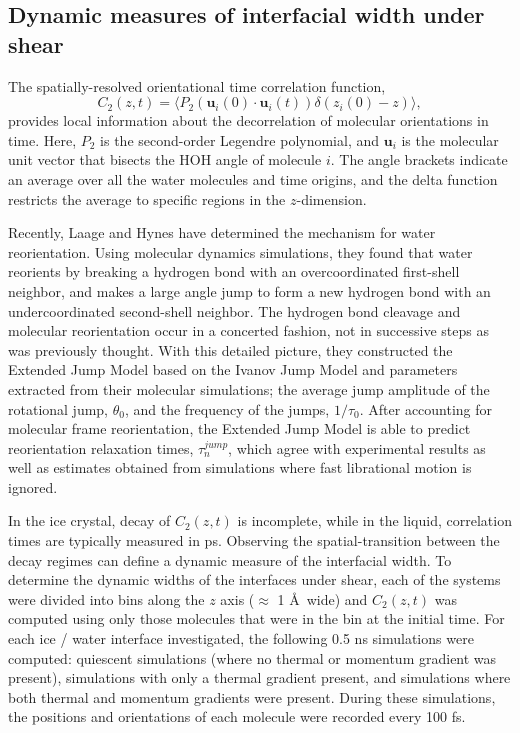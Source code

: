 \subsection{Dynamic measures of interfacial width under shear}
The spatially-resolved orientational time correlation function,
\begin{equation}\label{C(t)1}
  C_{2}(z,t)=\langle P_{2}(\mathbf{u}_i(0)\cdot \mathbf{u}_i(t))
  \delta(z_i(0) - z) \rangle,
\end{equation}
provides local information about the decorrelation of molecular
orientations in time. Here, $P_{2}$ is the second-order Legendre
polynomial, and $\mathbf{u}_i$ is the molecular unit vector that bisects
the HOH angle of molecule $i$. The angle brackets indicate an average
over all the water molecules and time origins, and the delta function
restricts the average to specific regions in the $z$-dimension. 

Recently, Laage and Hynes have determined the mechanism for water
reorientation.\cite{Laage2006,Laage2008} Using molecular dynamics
simulations, they found that water reorients by breaking a hydrogen
bond with an overcoordinated first-shell neighbor, and makes a large
angle jump to form a new hydrogen bond with an undercoordinated
second-shell neighbor.  The hydrogen bond cleavage and molecular
reorientation occur in a concerted fashion, not in successive steps as
was previously thought.  With this detailed picture, they constructed
the Extended Jump Model\cite{Laage2006,Laage2008} based on the Ivanov
Jump Model and parameters extracted from their molecular simulations;
the average jump amplitude of the rotational jump, $\theta_{0}$, and
the frequency of the jumps, $1/\tau_{0}$. After accounting for
molecular frame reorientation, the Extended Jump Model is able to
predict reorientation relaxation times, $\tau_{n}^{jump}$, which agree
with experimental results as well as estimates obtained from
simulations where fast librational motion is ignored.

In the ice crystal, decay of $C_2(z,t)$ is incomplete, while in the
liquid, correlation times are typically measured in ps. Observing the
spatial-transition between the decay regimes can define a dynamic
measure of the interfacial width.  To determine the dynamic widths of
the interfaces under shear, each of the systems were divided into bins
along the $z$ axis ($\approx$ 1 \AA\ wide) and $C_2(z,t)$ was computed
using only those molecules that were in the bin at the initial
time. For each ice / water interface investigated, the following 0.5
ns simulations were computed: quiescent simulations (where no thermal
or momentum gradient was present), simulations with only a thermal
gradient present, and simulations where both thermal and momentum
gradients were present. During these simulations, the positions and
orientations of each molecule were recorded every 100 fs.

